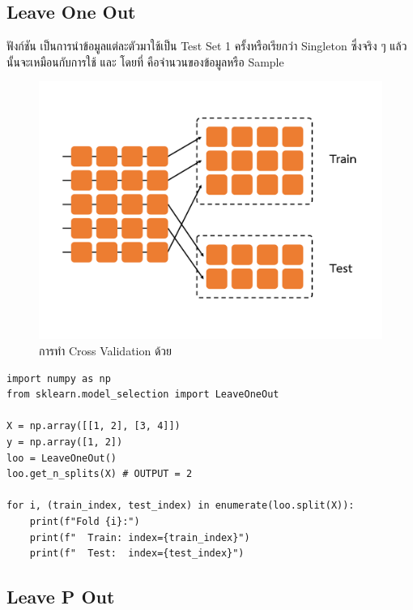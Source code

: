 \subsection{Leave One Out}
\label{ssec:leave_one_out}

ฟังก์ชัน  เป็นการนำข้อมูลแต่ละตัวมาใช้เป็น Test Set 1 ครั้งหรือเรียกว่า Singleton ซึ่งจริง ๆ แล้ว 
 นั้นจะเหมือนกับการใช้  และ  โดยที่ 
 คือจำนวนของข้อมูลหรือ Sample

\begin{figure}[H]
    \centering
    \includegraphics[width=0.9\linewidth,page=5]{fig/cross_validation.pdf}
    \caption{การทำ Cross Validation ด้วย }
    \label{fig:leave_one_out}
\end{figure}

\begin{lstlisting}[style=MyPython]
import numpy as np
from sklearn.model_selection import LeaveOneOut

X = np.array([[1, 2], [3, 4]])
y = np.array([1, 2])
loo = LeaveOneOut()
loo.get_n_splits(X) # OUTPUT = 2 

for i, (train_index, test_index) in enumerate(loo.split(X)):
    print(f"Fold {i}:")
    print(f"  Train: index={train_index}")
    print(f"  Test:  index={test_index}")
\end{lstlisting}

\subsection{Leave P Out}
\label{ssec:leave_p_out}

